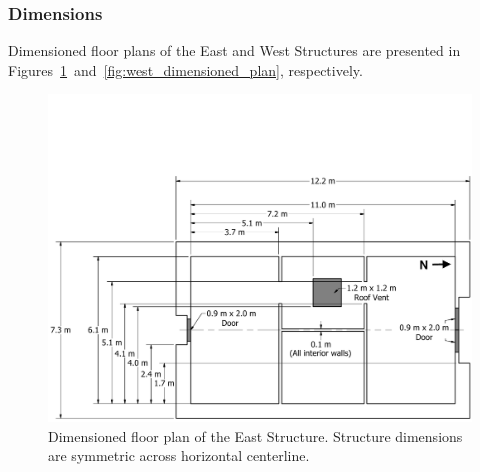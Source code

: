 \documentclass[12pt,oneside]{book}
\begin{document}
\subsubsection{Dimensions}
Dimensioned floor plans of the East and West Structures are presented in Figures~\ref{fig:east_dimensioned_plan}~and~\ref{fig:west_dimensioned_plan}, respectively.

\begin{figure}[!ht]
	\includegraphics[width=\columnwidth]{../Figures/Floor_Plans/East_Structure_Dimensioned_Full}
	\caption[Dimensioned floor plan of the East Structure.]{Dimensioned floor plan of the East Structure. Structure dimensions are symmetric across horizontal centerline.}
	\label{fig:east_dimensioned_plan}
\end{figure}
\end{document}
